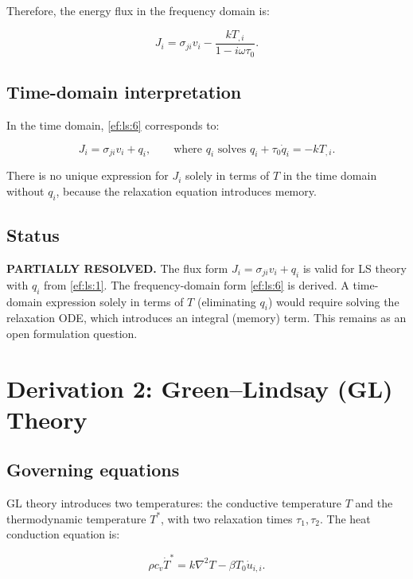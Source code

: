 \documentclass{article}
\begin{document}
Therefore, the energy flux in the frequency domain is:

\begin{equation}
J_i = \sigma_{ji}v_i - \frac{k T_{,i}}{1 - i\omega\tau_0}.
\label{ef:ls:6}
\end{equation}

\subsection{Time-domain interpretation}

In the time domain, \eqref{ef:ls:6} corresponds to:

\begin{equation}
J_i = \sigma_{ji}v_i + q_i,
\qquad \text{where } q_i \text{ solves } q_i + \tau_0\dot{q}_i = -k T_{,i}.
\label{ef:ls:7}
\end{equation}

There is no unique expression for $J_i$ solely in terms of $T$ in the time domain without $q_i$, because the relaxation equation introduces memory.

\subsection{Status}

\textbf{PARTIALLY RESOLVED.} The flux form $J_i = \sigma_{ji}v_i + q_i$ is valid for LS theory with $q_i$ from \eqref{ef:ls:1}. The frequency-domain form \eqref{ef:ls:6} is derived. A time-domain expression solely in terms of $T$ (eliminating $q_i$) would require solving the relaxation ODE, which introduces an integral (memory) term. This remains as an open formulation question.

\section{Derivation 2: Green--Lindsay (GL) Theory}

\subsection{Governing equations}

GL theory introduces two temperatures: the conductive temperature $T$ and the thermodynamic temperature $T^*$, with two relaxation times $\tau_1, \tau_2$. The heat conduction equation is:

\begin{equation}
\rho c_v \dot{T}^* = k\nabla^2 T - \beta T_0 \dot{u}_{i,i}.
\label{ef:gl:1}
\end{equation}
\end{document}

